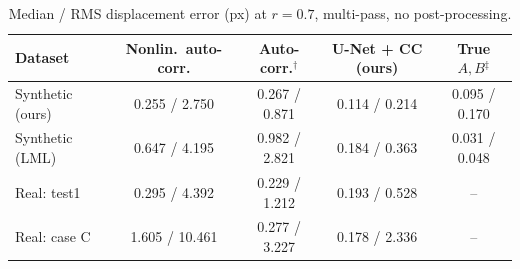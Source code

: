 \begin{table}[t]
\centering
\caption{Median / RMS displacement error (px) at $r=0.7$, multi-pass, no post-processing.}
\label{tab:accuracy}
\small
\begin{tabular}{lcccc}
\toprule
Dataset & Nonlin.\ auto-corr. & Auto-corr.$^\dagger$ & U-Net + CC (ours) & True $A,B$$^\ddagger$ \\
\midrule
Synthetic (ours) & 0.255 / 2.750 & 0.267 / 0.871 & 0.114 / 0.214 & 0.095 / 0.170 \\
Synthetic (LML) & 0.647 / 4.195 & 0.982 / 2.821 & 0.184 / 0.363 & 0.031 / 0.048 \\
Real: test1 & 0.295 / 4.392 & 0.229 / 1.212 & 0.193 / 0.528 & -- \\
Real: case C & 1.605 / 10.461 & 0.277 / 3.227 & 0.178 / 2.336 & -- \\
\bottomrule
\end{tabular}
\end{table}
